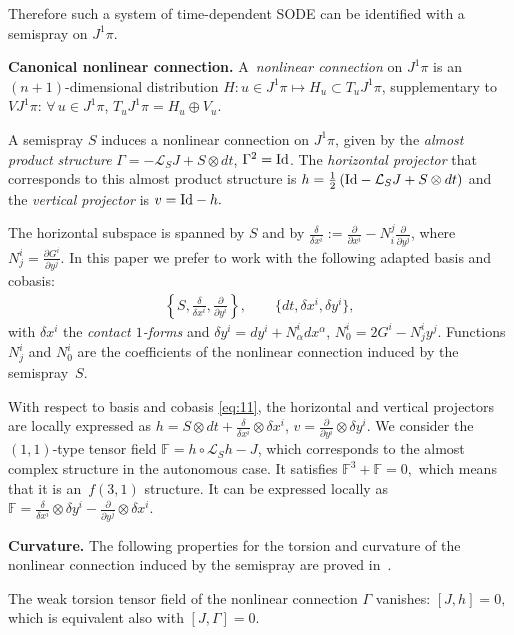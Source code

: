 Therefore such a system of time-dependent SODE can be identif\/ied with
a semispray on $J^{1}\pi$.

{\bf Canonical nonlinear connection.}
A~\emph{nonlinear connection} on $J^{1}\pi$ is an $(n+1)$-dimensional
distribution $H:u\in J^{1}\pi\mapsto H_{u}\subset T_{u}J^{1}\pi$,
supplementary to $VJ^{1}\pi$: $\forall\, u\in J^{1}\pi$, $T_{u}J^{1}\pi=H_{u}\oplus V_{u}$.

A semispray $S$ induces a nonlinear connection on $J^{1}\pi$, given
by the \emph{almost product structure} $\Gamma=-\mathcal{L}_{S}J+S\otimes dt$, $\Gamma^{2}={\rm Id}$.
The \emph{horizontal projector} that corresponds to this almost product
structure is $h=\frac{1}{2}\left({\rm Id}-\mathcal{L}_{S}J+S\otimes dt\right)$
and the \emph{vertical projector} is $v={\rm Id}-h.$

The horizontal subspace is spanned by $S$ and by $\frac{\delta}{\delta x^{i}}:=\frac{\partial}{\partial x^{i}}-N_{i}^{j}\frac{\partial}{\partial y^{j}}$, where $N_{j}^{i}=\frac{\partial G^{i}}{\partial y^{j}}$.
In this paper we prefer to work with the following adapted basis and
cobasis:
\begin{gather}
\left\{ S,\frac{\delta}{\delta x^{i}},\frac{\partial}{\partial y^{i}}\right\} ,\qquad\{dt,\delta x^{i},\delta y^{i}\},\label{eq:11}
\end{gather}
 with $\delta x^{i}$ the \emph{contact $1$-forms} and $\delta y^{i}=dy^{i}+N_{\alpha}^{i}dx^{\alpha}$, $N_{0}^{i}=2G^{i}-N_{j}^{i}y^{j}$.
Functions $N_{j}^{i}$ and $N_{0}^{i}$ are the coef\/f\/icients of the
nonlinear connection induced by the semispray~$S$.

With respect to basis and cobasis \eqref{eq:11}, the horizontal and
vertical projectors are locally expressed as $h=S\otimes dt+\frac{\delta}{\delta x^{i}}\otimes\delta x^{i}$, $v=\frac{\partial}{\partial y^{i}}\otimes\delta y^{i}$.
We consider the $(1,1)$-type tensor f\/ield $\mathbb{F}=h\circ\mathcal{L}_{S}h-J$,
which corresponds to the almost complex structure in the autonomous
case. It satisf\/ies $\mathbb{F}^{3}+\mathbb{F}=0,$ which means that
it is an~$f(3,1)$ structure. It can be expressed locally as $\mathbb{F}=\frac{\delta}{\delta x^{i}}\otimes\delta y^{i}-\frac{\partial}{\partial y^{j}}\otimes\delta x^{i}$.



{\bf Curvature.}
The following properties for the torsion and curvature of the nonlinear
connection induced by the semispray are proved in~\cite{B-C-2010}.

The weak torsion tensor f\/ield of the nonlinear connection $\Gamma$
vanishes: $[J,h]=0,$ which is equivalent also with $[J,\Gamma]=0$.

